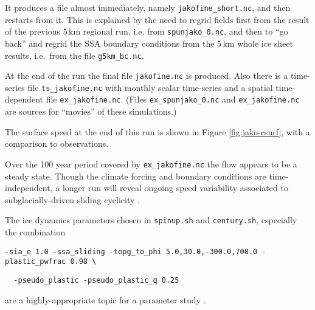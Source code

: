 It produces a file almost immediately, namely \verb|jakofine_short.nc|, and then restarts from it.  This is explained by the need to regrid fields first from the result of the previous 5\,km regional run, i.e. from \verb|spunjako_0.nc|, and then to ``go back'' and regrid the SSA boundary conditions from the 5\,km whole ice sheet results, i.e.~from the file \verb|g5km_bc.nc|.

At the end of the run the final file \verb|jakofine.nc| is produced.  Also there is a time-series file \verb|ts_jakofine.nc| with monthly scalar time-series and a spatial time-dependent file \verb|ex_jakofine.nc|.  (Files \verb|ex_spunjako_0.nc| and \verb|ex_jakofine.nc| are sources for ``movies'' of these simulations.)

The surface speed at the end of this run is shown in Figure \ref{fig:jako-csurf}, with a comparison to observations.

Over the 100 year period covered by \verb|ex_jakofine.nc| the flow appears to be a steady state.  Though the climate forcing and boundary conditions are time-independent, a longer run will reveal ongoing speed variability associated to subglacially-driven sliding cyclicity \cite{vanPeltOerlemans2012}.

The ice dynamics parameters chosen in \verb|spinup.sh| and \verb|century.sh|, especially the combination

  \verb|-sia_e 1.0 -ssa_sliding -topg_to_phi 5.0,30.0,-300.0,700.0 -plastic_pwfrac 0.98 \|

  \verb|  -pseudo_plastic -pseudo_plastic_q 0.25|
  
\noindent are a highly-appropriate topic for a parameter study \cite{BKAJS}.


\begin{comment}

\subsection*{Plotting the results}

This is about Figure {fig:jako-csurf}.  We use  PyPISMTools.

To visualize the surface speed at the end of the 2\,km run, download PyPISMTools and do
\begin{verbatim}
$ ncpdq -a time,z,y,x spunjako_0.nc jako5km.nc
$ nc2cdo.py jako5km.nc
$ cdo remapbil,jako5km.nc Greenland_5km_v1.1.nc Greenland_5km_v1.1_jako.nc
$ ncap2 -O -s "csurf=surfvelmag*1.;" Greenland_5km_v1.1_jako.nc Greenland_5km_v1.1_jako.nc
$ basemap-plot.py -v csurf --singlerow -o jako-csurf.png jakofine.nc Greenland_5km_v1.1_jako.nc
\end{verbatim}

To choose a colormap add option \verb|--colormap foo.cpt| or similar.

\end{comment}